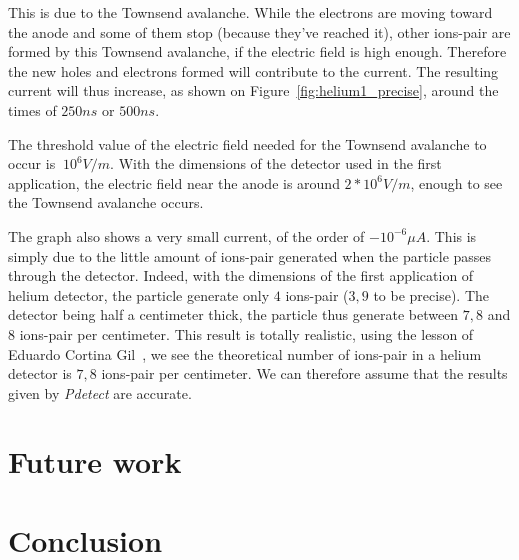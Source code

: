 \documentclass[11pt]{article}
\begin{document}
			This is due to the Townsend avalanche. While the electrons are moving toward the anode and some of them stop
			(because they've reached it), other ions-pair are formed by this Townsend avalanche, if the electric field is 
			high enough. Therefore the new holes and electrons formed will contribute to the current. The resulting current
			will thus increase, as shown on Figure~\ref{fig:helium1_precise}, around the times of $250ns$ or $500ns$.

			The threshold value of the electric field needed for the Townsend avalanche to occur is $~10^6V/m$. With the 
			dimensions of the detector used in the first application, the electric field near the anode is around 
			$2*10^6V/m$, enough to see the Townsend avalanche occurs.

			The graph also shows a very small current, of the order of $-10^{-6}\mu A$. This is simply due to the little
			amount of ions-pair generated when the particle passes through the detector. Indeed, with the dimensions of the
			first application of helium detector, the particle generate only $4$ ions-pair ($3,9$ to be precise). The detector 
			being half a centimeter thick, the particle thus generate between $7,8$ and $8$ ions-pair per centimeter.
			This result is totally realistic, using the lesson of Eduardo Cortina Gil~\cite{lphy2236}, we see the theoretical
			number of ions-pair in a helium detector is $7,8$ ions-pair per centimeter. We can therefore assume that the
			results given by \textit{Pdetect} are accurate.

\section{Future work}

\section{Conclusion}

\newpage



\end{document}
